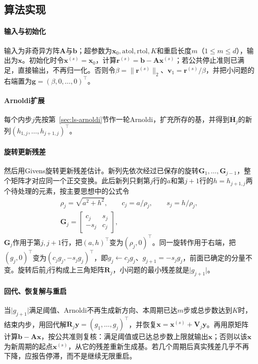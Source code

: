 \subsection{算法实现}

\paragraph{输入与初始化}
输入为非奇异方阵$\bm A$与$\bm b$；超参数为$\bm x_0,\mathrm{atol},\mathrm{rtol},K$和重启长度$m$（$1\le m\le d$），输出为$\bm x$。初始化时令$\bm x^{(s)}=\bm x_0$，计算$\bm r^{(s)}=\bm b-\bm A\bm x^{(s)}$；若公共停止准则已满足，直接输出，不再归一化。否则令$\beta=\lVert\bm r^{(s)}\rVert_2$、$\bm v_1=\bm r^{(s)}/\beta$，并把小问题的右端置为$\bm g=(\beta,0,\ldots,0)^\top$。

\paragraph{Arnoldi扩展}
每个内步$j$先按第~\ref{sec:ls-arnoldi}节作一轮Arnoldi，扩充所存的基，并得到$\overline{\bm H}_j$的新列$(h_{1,j},\ldots,h_{j+1,j})^\top$。

\paragraph{旋转更新残差}
然后用Givens旋转更新残差估计。新列先依次经过已保存的旋转$\bm G_1,\ldots,\bm G_{j-1}$，整个矩阵才对应同一个正交变换。此后新列只剩第$j$行的$a$和第$j+1$行的$h=h_{j+1,j}$两个待处理的元素，按主要思想中的公式令
\[
 \begin{gathered}
 \rho_j=\sqrt{a^2+h^2},\qquad c_j=a/\rho_j,\qquad s_j=h/\rho_j,\\
 \bm G_j=\begin{bmatrix}c_j&s_j\\-s_j&c_j\end{bmatrix},
 \end{gathered}
\]
$\bm G_j$作用于第$j,j+1$行，把$(a,h)^\top$变为$(\rho_j,0)^\top$。同一旋转作用于右端，把$(g_j,0)^\top$变为$(c_jg_j,-s_jg_j)^\top$，即$g_j\leftarrow c_jg_j$、$g_{j+1}=-s_jg_j$，前面已确定的分量不变。旋转后前$j$行构成上三角矩阵$\bm R_j$，小问题的最小残差就是$\lvert g_{j+1}\rvert$。

\paragraph{回代、恢复解与重启}
当$\lvert g_{j+1}\rvert$满足阈值、Arnoldi不再生成新方向、本周期已达$m$步或总步数达到$K$时，结束内步，用回代解$\bm R_j\bm y=(g_1,\ldots,g_j)^\top$，并恢复$\bm x=\bm x^{(s)}+\bm V_j\bm y$。再用原矩阵计算$\bm b-\bm A\bm x$，按公共准则复核：满足阈值或已达总步数上限就输出$\bm x$；否则以该$\bm x$为新周期的起点$\bm x^{(s)}$，从它的残差重新生成基。若几个周期后真实残差几乎不再下降，应报告停滞，而不是继续无限重启。

